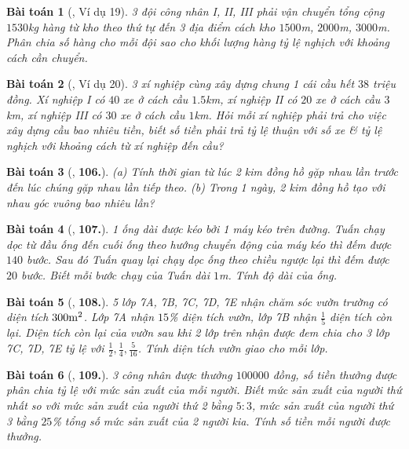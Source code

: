 \documentclass{article}
\newtheorem{baitoan}{Bài toán}
\begin{document}
\begin{baitoan}[\cite{Binh_Toan_7_tap_1}, Ví dụ 19]
	3 đội công nhân I, II, III phải vận chuyển tổng cộng $1530$\emph{kg} hàng từ kho theo thứ tự đến 3 địa điểm cách kho $1500$\emph{m}, $2000$\emph{m}, $3000$\emph{m}. Phân chia số hàng cho mỗi đội sao cho khối lượng hàng tỷ lệ nghịch với khoảng cách cần chuyển.
\end{baitoan}

\begin{baitoan}[\cite{Binh_Toan_7_tap_1}, Ví dụ 20]
	3 xí nghiệp cùng xây dựng chung 1 cái cầu hết $38$ triệu đồng. Xí nghiệp I có $40$ xe ở cách cầu $1.5$\emph{km}, xí nghiệp II có $20$ xe ở cách cầu $3$\emph{km}, xí nghiệp III có $30$ xe ở cách cầu $1$\emph{km}. Hỏi mỗi xí nghiệp phải trả cho việc xây dựng cầu bao nhiêu tiền, biết số tiền phải trả tỷ lệ thuận với số xe \& tỷ lệ nghịch với khoảng cách từ xí nghiệp đến cầu?
\end{baitoan}

\begin{baitoan}[\cite{Binh_Toan_7_tap_1}, \textbf{106.}]
	
		(a) Tính thời gian từ lúc 2 kim đồng hồ gặp nhau lần trước đến lúc chúng gặp nhau lần tiếp theo.
		(b) Trong 1 ngày, 2 kim đồng hồ tạo với nhau góc vuông bao nhiêu lần?
	
\end{baitoan}

\begin{baitoan}[\cite{Binh_Toan_7_tap_1}, \textbf{107.}]
	1 ống dài được kéo bởi 1 máy kéo trên đường. Tuấn chạy dọc từ đầu ống đến cuối ống theo hướng chuyển động của máy kéo thì đếm được $140$ bước. Sau đó Tuấn quay lại chạy dọc ống theo chiều ngược lại thì đếm được $20$ bước. Biết mỗi bước chạy của Tuấn dài $1$\emph{m}. Tính độ dài của ống.
\end{baitoan}

\begin{baitoan}[\cite{Binh_Toan_7_tap_1}, \textbf{108.}]
	5 lớp 7A, 7B, 7C, 7D, 7E nhận chăm sóc vườn trường có diện tích $300\rm m^2$. Lớp 7A nhận $15$\% diện tích vườn, lớp 7B nhận $\frac{1}{5}$ diện tích còn lại. Diện tích còn lại của vườn sau khi 2 lớp trên nhận được đem chia cho 3 lớp 7C, 7D, 7E tỷ lệ với $\frac{1}{2},\frac{1}{4},\frac{5}{16}$. Tính diện tích vườn giao cho mỗi lớp.
\end{baitoan}

\begin{baitoan}[\cite{Binh_Toan_7_tap_1}, \textbf{109.}]
	3 công nhân được thưởng $100000$ đồng, số tiền thưởng được phân chia tỷ lệ với mức sản xuất của mỗi người. Biết mức sản xuất của người thứ nhất so với mức sản xuất của người thứ 2 bằng $5:3$, mức sản xuất của người thứ 3 bằng $25$\% tổng số mức sản xuất của 2 người kia. Tính số tiền mỗi người được thưởng.
\end{baitoan}
\end{document}
